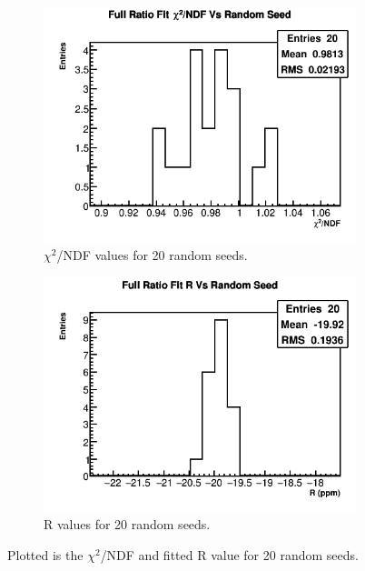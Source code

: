 		\begin{figure}[]
		\centering
		    \begin{subfigure}[t]{0.45\textwidth}
			    \centering
				\includegraphics[width=\textwidth]{RatioCBO_Chi2NDF_Vs_Iter_Canv_hist}
			    \caption{$\chi^{2}$/NDF values for 20 random seeds.}
		    \end{subfigure}
		    \begin{subfigure}[t]{0.45\textwidth}
			    \centering
				\includegraphics[width=\textwidth]{RatioCBO_R_Vs_Iter_Canv_hist}
			    \caption{R values for 20 random seeds.}
		    \end{subfigure}%
		\caption[RandomSeeds]{Plotted is the $\chi^{2}$/NDF and fitted R value for 20 random seeds.}
		\label{fig:RandomSeeds}
		\end{figure}

